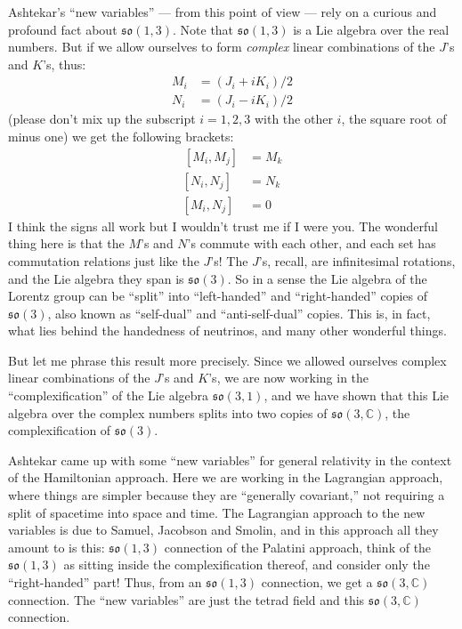 \documentclass[12pt]{article}
\begin{document}
Ashtekar's ``new variables'' --- from this point of view --- rely on a
curious and profound fact about \(\mathfrak{so}(1,3)\). Note that
\(\mathfrak{so}(1,3)\) is a Lie algebra over the real numbers. But if we
allow ourselves to form \emph{complex} linear combinations of the
\(J\)'s and \(K\)'s, thus:
\[\begin{aligned}M_i &= (J_i + iK_i)/2 \\ N_i &= (J_i -iK_i)/2\end{aligned}\]
(please don't mix up the subscript \(i = 1,2,3\) with the other \(i\),
the square root of minus one) we get the following brackets:
\[\begin{aligned}\,[M_i,M_j] &= M_k \\ [N_i,N_j] &= N_k \\ [M_i,N_j] &= 0\end{aligned}\]
I think the signs all work but I wouldn't trust me if I were you. The
wonderful thing here is that the \(M\)'s and \(N\)'s commute with each
other, and each set has commutation relations just like the \(J\)'s! The
\(J\)'s, recall, are infinitesimal rotations, and the Lie algebra they
span is \(\mathfrak{so}(3)\). So in a sense the Lie algebra of the
Lorentz group can be ``split'' into ``left-handed'' and ``right-handed''
copies of \(\mathfrak{so}(3)\), also known as ``self-dual'' and
``anti-self-dual'' copies. This is, in fact, what lies behind the
handedness of neutrinos, and many other wonderful things.

But let me phrase this result more precisely. Since we allowed ourselves
complex linear combinations of the \(J\)'s and \(K\)'s, we are now
working in the ``complexification'' of the Lie algebra
\(\mathfrak{so}(3,1)\), and we have shown that this Lie algebra over the
complex numbers splits into two copies of
\(\mathfrak{so}(3,\mathbb{C})\), the complexification of
\(\mathfrak{so}(3)\).

Ashtekar came up with some ``new variables'' for general relativity in
the context of the Hamiltonian approach. Here we are working in the
Lagrangian approach, where things are simpler because they are
``generally covariant,'' not requiring a split of spacetime into space
and time. The Lagrangian approach to the new variables is due to Samuel,
Jacobson and Smolin, and in this approach all they amount to is this:
\(\mathfrak{so}(1,3)\) connection of the Palatini approach, think of the
\(\mathfrak{so}(1,3)\) as sitting inside the complexification thereof,
and consider only the ``right-handed'' part! Thus, from an
\(\mathfrak{so}(1,3)\) connection, we get a
\(\mathfrak{so}(3,\mathbb{C})\) connection. The ``new variables'' are
just the tetrad field and this \(\mathfrak{so}(3,\mathbb{C})\)
connection.
\end{document}
